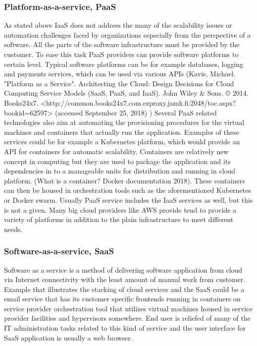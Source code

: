 \documentclass{article}
\begin{document}
\subsubsection{Platform-as-a-service, PaaS}
As stated above IaaS does not address the many of the scalability issues or automation challenges faced by organizations especially from the perspective of a software. All the parts of the software infrastructure must be provided by the customer. To ease this task PaaS providers can provide software platforms to certain level. Typical software platforms can be for example databases, logging and payments services, which can be used via various APIs (Kavis, Michael. "Platform as a Service". Architecting the Cloud: Design Decisions for Cloud Computing Service Models (SaaS, PaaS, and IaaS). John Wiley & Sons. © 2014. Books24x7. <http://common.books24x7.com.ezproxy.jamk.fi:2048/toc.aspx?bookid=62597> (accessed September 25, 2018) )
Several PaaS related technologies also aim at automating the provisioning procedures for the virtual machines and containers that actually run the application. Examples of these services could be for example a Kubernetes platform, which would provide an API for containers for automatic scalability. Containers are relatively new concept in computing but they are used to package the application and its dependencies in to a manageable units for distribution and running in cloud platform. (What is a container? Docker documentation 2018). These containers can then be housed in orchestration tools such as the aforementioned Kubernetes or Docker swarm. 
Usually PaaS service includes the IaaS services as well, but this is not a given. Many big cloud providers like AWS provide tend to provide a variety of platforms in addition to the plain infrastructure to meet different needs.
\subsubsection{Software-as-a-service, SaaS}
Software as a service is a method of delivering software application from cloud via Internet connectivity with the least amount of manual work from customer.
Example that illustrates the stacking of cloud services and the SaaS could be a email service that has its customer specific frontends running in containers on service provider orchestration tool that utilizes virtual machines housed in service provider facilities  and hypervisors somewhere.
End user is reliefed of many of the IT administration tasks related to this kind of service and the user interface for SaaS application is usually a web browser.
\end{document}
